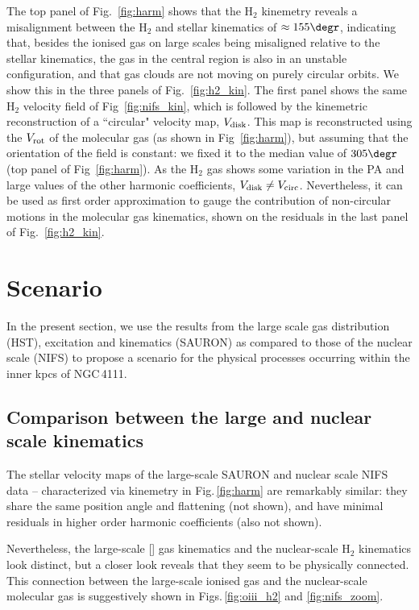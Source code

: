 \documentclass[fleqn,usenatbib]{mnras}
\begin{document}
The top panel of Fig.~\ref{fig:harm} shows that the H$_2$ kinemetry reveals a misalignment between the H$_2$ and stellar kinematics of $\approx 155\degr$, indicating that, besides the ionised gas on large scales being misaligned relative to the stellar kinematics, the gas in the central region is also in an unstable configuration, and that gas clouds are not moving on purely circular orbits. We show this in the three panels of Fig.~\ref{fig:h2_kin}. The first panel shows the same H$_2$ velocity field of Fig~\ref{fig:nifs_kin}, which is followed by the kinemetric reconstruction of a ``circular" velocity map, $V_{\rm disk}$. This map is reconstructed using the $V_{\rm rot}$ of the molecular gas (as shown in Fig~\ref{fig:harm}), but assuming that the orientation of the field is constant: we fixed it to the median value of $305\degr$ (top panel of Fig~\ref{fig:harm}). As the H$_2$ gas shows some variation in the PA and large values of the other harmonic coefficients, $V_{\rm disk} \ne V_{\rm circ}$. Nevertheless, it can be used as first order approximation to gauge the contribution
of non-circular motions in the molecular gas kinematics, shown on the residuals in the last panel of Fig.~\ref{fig:h2_kin}.


\section{Scenario}

In the present section, we use the results from the large scale gas distribution (HST), excitation and kinematics (SAURON) as compared to those of the nuclear scale (NIFS) to propose a scenario for the physical processes occurring within the inner kpcs of NGC\,4111.


\subsection{Comparison between the large and nuclear scale kinematics}

The stellar velocity maps of the large-scale SAURON and nuclear scale NIFS data -- characterized via kinemetry in Fig.\,\ref{fig:harm} are remarkably similar: they share the same position angle and flattening (not shown), and have minimal residuals in higher order harmonic coefficients (also not shown).

Nevertheless, the large-scale [] gas kinematics and the nuclear-scale H$_2$ kinematics look distinct, but a closer look reveals that they seem to be physically connected. This connection between the large-scale ionised gas and the nuclear-scale molecular gas is suggestively shown in Figs.\,\ref{fig:oiii_h2} and \ref{fig:nifs_zoom}.
\end{document}
